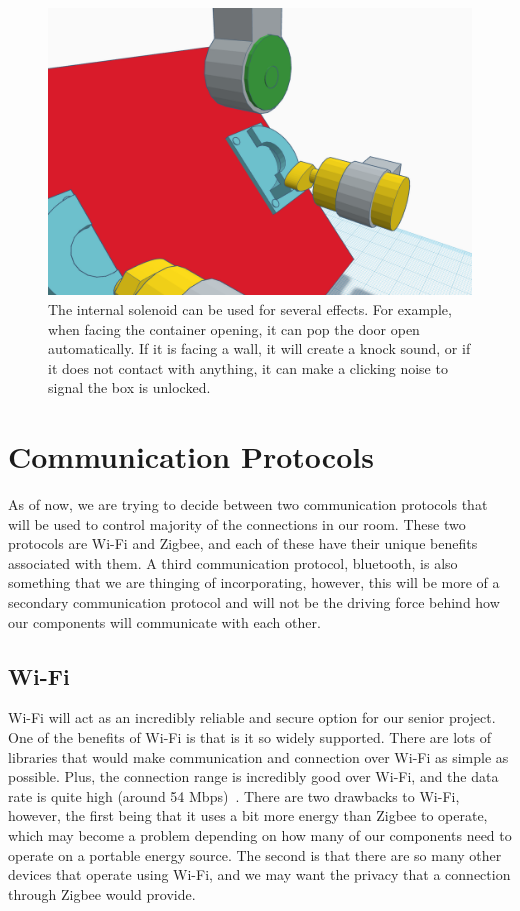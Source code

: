 \documentclass[conference]{IEEEtran}
\begin{document}
\begin{figure}[H]
    \centering
    \includegraphics[width=0.85\columnwidth]{Images/OpenContainer.png}
    \caption{The internal solenoid can be used for several effects. For example, when facing the container opening, it can pop the
        door open automatically. If it is facing a wall, it will create a knock sound, or if it does not contact with anything, it can
        make a clicking noise to signal the box is unlocked.}
\end{figure}
 
\section{Communication Protocols}
As of now, we are trying to decide between two communication protocols that will be used
to control majority of the connections in our room. These two protocols are Wi-Fi and Zigbee,
and each of these have their unique benefits associated with them. A third communication
protocol, bluetooth, is also something that we are thinging of incorporating, however, this
will be more of a secondary communication protocol and will not be the driving force behind
how our components will communicate with each other.

\subsection*{Wi-Fi}
Wi-Fi will act as an incredibly reliable and secure option for our senior project. One of the benefits of Wi-Fi
is that is it so widely supported. There are lots of libraries that would make communication and connection over
Wi-Fi as simple as possible. Plus, the connection range is incredibly good over Wi-Fi, and the data rate is quite high
(around 54 Mbps)~\cite{wifiVsZigbee}. There are two drawbacks to Wi-Fi, however, the first being that it uses a bit more energy than Zigbee
to operate, which may become a problem depending on how many of our components need to operate on a portable energy
source. The second is that there are so many other devices that operate using Wi-Fi, and we may want the privacy that
a connection through Zigbee would provide.
\end{document}
